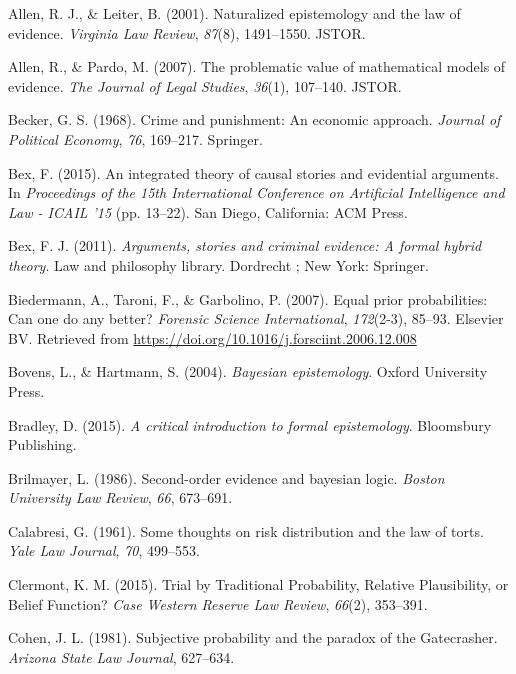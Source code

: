 \documentclass[11pt,dvipsnames,enabledeprecatedfontcommands]{scrartcl}
\begin{document}
\hypertarget{ref-allen2001naturalized}{}
Allen, R. J., \& Leiter, B. (2001). Naturalized epistemology and the law
of evidence. \emph{Virginia Law Review}, \emph{87}(8), 1491--1550.
JSTOR.

\hypertarget{ref-allen2007problematic}{}
Allen, R., \& Pardo, M. (2007). The problematic value of mathematical
models of evidence. \emph{The Journal of Legal Studies}, \emph{36}(1),
107--140. JSTOR.

\hypertarget{ref-becker1968crime}{}
Becker, G. S. (1968). Crime and punishment: An economic approach.
\emph{Journal of Political Economy}, \emph{76}, 169--217. Springer.

\hypertarget{ref-bex2015IntegratedTheoryCausal}{}
Bex, F. (2015). An integrated theory of causal stories and evidential
arguments. In \emph{Proceedings of the 15th International Conference on
Artificial Intelligence and Law - ICAIL '15} (pp. 13--22). San Diego,
California: ACM Press.

\hypertarget{ref-bex2011ArgumentsStoriesCriminal}{}
Bex, F. J. (2011). \emph{Arguments, stories and criminal evidence: A
formal hybrid theory}. Law and philosophy library. Dordrecht ; New York:
Springer.

\hypertarget{ref-Biedermann2007equal}{}
Biedermann, A., Taroni, F., \& Garbolino, P. (2007). Equal prior
probabilities: Can one do any better? \emph{Forensic Science
International}, \emph{172}(2-3), 85--93. Elsevier BV. Retrieved from
\url{https://doi.org/10.1016/j.forsciint.2006.12.008}

\hypertarget{ref-bovens2004bayesian}{}
Bovens, L., \& Hartmann, S. (2004). \emph{Bayesian epistemology}. Oxford
University Press.

\hypertarget{ref-bradley2015critical}{}
Bradley, D. (2015). \emph{A critical introduction to formal
epistemology}. Bloomsbury Publishing.

\hypertarget{ref-brilmayer1986}{}
Brilmayer, L. (1986). Second-order evidence and bayesian logic.
\emph{Boston University Law Review}, \emph{66}, 673--691.

\hypertarget{ref-Calabresi1961}{}
Calabresi, G. (1961). Some thoughts on risk distribution and the law of
torts. \emph{Yale Law Journal}, \emph{70}, 499--553.

\hypertarget{ref-clermont2015TrialTraditionalProbability}{}
Clermont, K. M. (2015). Trial by Traditional Probability, Relative
Plausibility, or Belief Function? \emph{Case Western Reserve Law
Review}, \emph{66}(2), 353--391.

\hypertarget{ref-Cohen81}{}
Cohen, J. L. (1981). Subjective probability and the paradox of the
Gatecrasher. \emph{Arizona State Law Journal}, 627--634.
\end{document}

